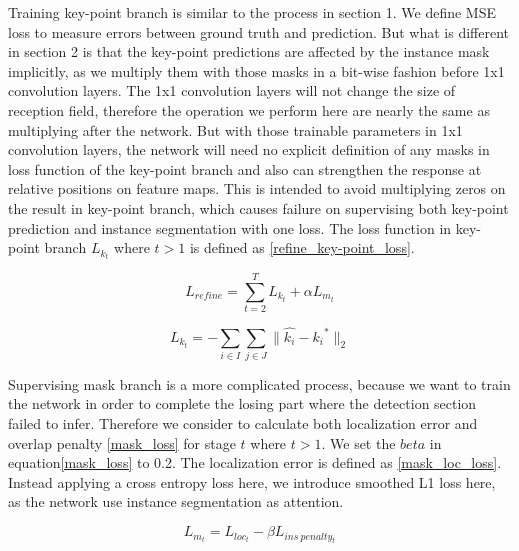 Training key-point branch is similar to the process in section 1. We define MSE loss to measure errors between ground truth and prediction. But what is different in section 2 is that the key-point predictions are affected by the instance mask implicitly, as we multiply them with those masks in a bit-wise fashion before 1x1 convolution layers. The 1x1 convolution layers will not change the size of reception field, therefore the operation we perform here are nearly the same as multiplying after the network. But with those trainable parameters in 1x1 convolution layers, the network will need no explicit definition of any masks in loss function of the key-point branch and also can strengthen the response at relative positions on feature maps. This is intended to avoid multiplying zeros on the result in key-point branch, which causes failure on supervising both key-point prediction and instance segmentation with one loss. The loss function in key-point branch $L_{k_t}$ where $t>1$ is defined as \eqref{refine_key-point_loss}. 

\begin{equation}
\label{total_refine_loss}
L_{refine} = \sum_{t=2}^{T}{L_{k_t} + \alpha L_{m_t}}
\end{equation}

\begin{equation}
\label{refine_key-point_loss}
L_{k_{t}} = -\sum_{i \in I}\sum_{j \in J}{\parallel \hat{k_i} - {k_i}^{*} \parallel_2}
\end{equation}

Supervising mask branch is a more complicated process, because we want to train the network in order to complete the losing part where the detection section failed to infer. Therefore we consider to calculate both localization error and overlap penalty \eqref{mask_loss} for stage $t$ where $t>1$. We set the $beta$ in equation\eqref{mask_loss} to 0.2. The localization error is defined as \eqref{mask_loc_loss}. Instead applying a cross entropy loss here, we introduce smoothed L1 loss here, as the network use instance segmentation as attention.

\begin{equation}
\label{mask_loss}
L_{m_t}=L_{loc_t} - \beta L_{ins\ penalty_t}
\end{equation}

